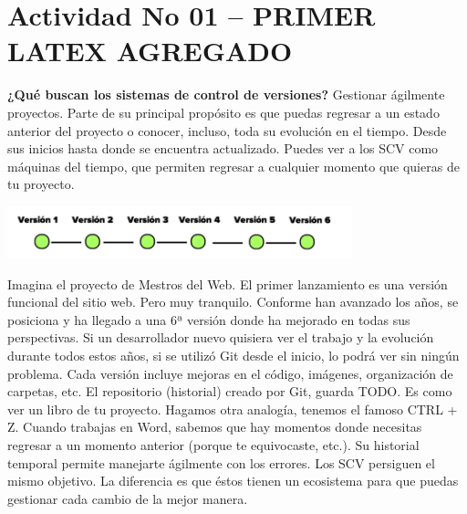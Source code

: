\section{Actividad No 01 – 	PRIMER LATEX AGREGADO} 

 \textbf{¿Qué buscan los sistemas de control de versiones?}
Gestionar ágilmente proyectos. Parte de su principal propósito es que puedas regresar a un estado anterior del proyecto o conocer, incluso, toda su evolución en el tiempo. Desde sus inicios hasta donde se encuentra actualizado. Puedes ver a los SCV como máquinas del tiempo, que permiten regresar a cualquier momento que quieras de tu proyecto. 

\begin{center}
\includegraphics[width=10cm]{./Imagenes/Imagen001.png} 
\end{center}

Imagina el proyecto de Mestros del Web. El primer lanzamiento es una versión funcional del sitio web. Pero muy tranquilo. Conforme han avanzado los años, se posiciona y ha llegado a una 6ª versión donde ha mejorado en todas sus perspectivas. Si un desarrollador nuevo quisiera ver el trabajo y la evolución durante todos estos años, si se utilizó Git desde el inicio, lo podrá ver sin ningún problema. Cada versión incluye mejoras en el código, imágenes, organización de carpetas, etc. El repositorio (historial) creado por Git, guarda TODO. Es como ver un libro de tu proyecto. Hagamos otra analogía, tenemos el famoso CTRL + Z. Cuando trabajas en Word, sabemos que hay momentos donde necesitas regresar a un momento anterior (porque te equivocaste, etc.). Su historial temporal permite manejarte ágilmente con los errores. Los SCV persiguen el mismo objetivo. La diferencia es que éstos tienen un ecosistema para que puedas gestionar cada cambio de la mejor manera.